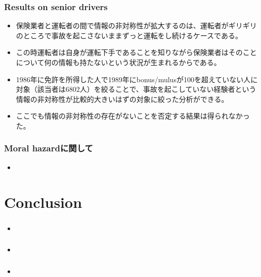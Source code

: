 \documentclass[dvipdfmx, 12pt]{beamer}
\begin{document}
\begin{frame}\frametitle{Results on senior drivers}
	\begin{itemize}
	\item 保険業者と運転者の間で情報の非対称性が拡大するのは、運転者がギリギリのところで事故を起こさないままずっと運転をし続けるケースである。
	\item この時運転者は自身が運転下手であることを知りながら保険業者はそのことについて何の情報も持たないという状況が生まれるからである。
	\item 1986年に免許を所得した人で1989年にbonus/mulusが100を超えていない人に対象（該当者は6802人）を絞ることで、事故を起こしていない経験者という情報の非対称性が比較的大きいはずの対象に絞った分析ができる。
	\item ここでも情報の非対称性の存在がないことを否定する結果は得られなかった。
	\end{itemize}
\end{frame}

\begin{frame}\frametitle{Moral hazardに関して}
	\begin{itemize}
	\item 
	\end{itemize}
\end{frame}


\section{Conclusion}
\begin{frame}\frametitle{}
	\begin{itemize}
	\item 
	\end{itemize}
\end{frame}

\begin{frame}\frametitle{}
	\begin{itemize}
	\item 
	\end{itemize}
\end{frame}

\begin{frame}\frametitle{}
	\begin{itemize}
	\item 
	\end{itemize}
\end{frame}
\end{document}
